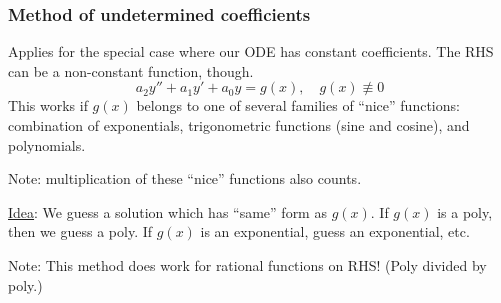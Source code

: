 \documentclass{article}
\newcommand{\nequiv}{\mathrel{\not\equiv}}
\newcommand{\tmtextbf}[1]{\text{{\bfseries{#1}}}}
\begin{document}
\subsubsection{Method of undetermined coefficients}

Applies for the special case where our ODE has constant coefficients. The RHS
can be a non-constant function, though.
\[ a_2 y'' + a_1 y' + a_0 y = g (x), \quad g (x) \nequiv 0 \]
This works if $g (x)$ belongs to one of several families of ``nice''
functions: combination of exponentials, trigonometric functions (sine and
cosine), and polynomials.

Note: multiplication of these ``nice'' functions also counts.

{\underline{Idea}}: We guess a solution which has ``same'' form as $g (x)$. If
$g (x)$ is a poly, then we guess a poly. If $g (x)$ is an exponential, guess
an exponential, etc.

Note: This method does \tmtextbf{not} work for rational functions on RHS!
(Poly divided by poly.)
\end{document}
